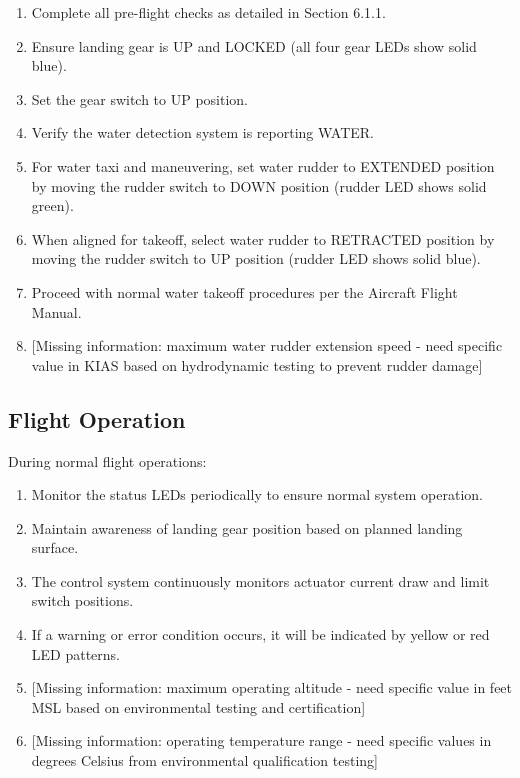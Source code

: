 \documentclass[12pt,a4paper,twoside,openright]{book}
\begin{document}
\begin{enumerate}
    \item Complete all pre-flight checks as detailed in Section 6.1.1.
    \item Ensure landing gear is UP and LOCKED (all four gear LEDs show solid blue).
    \item Set the gear switch to UP position.
    \item Verify the water detection system is reporting WATER.
    \item For water taxi and maneuvering, set water rudder to EXTENDED position by moving the rudder switch to DOWN position (rudder LED shows solid green).
    \item When aligned for takeoff, select water rudder to RETRACTED position by moving the rudder switch to UP position (rudder LED shows solid blue).
    \item Proceed with normal water takeoff procedures per the Aircraft Flight Manual.
    \item {\color{red}[Missing information: maximum water rudder extension speed - need specific value in KIAS based on hydrodynamic testing to prevent rudder damage]}
\end{enumerate}

\subsection{Flight Operation}

During normal flight operations:

\begin{enumerate}
    \item Monitor the status LEDs periodically to ensure normal system operation.
    \item Maintain awareness of landing gear position based on planned landing surface.
    \item The control system continuously monitors actuator current draw and limit switch positions.
    \item If a warning or error condition occurs, it will be indicated by yellow or red LED patterns.
    \item {\color{red}[Missing information: maximum operating altitude - need specific value in feet MSL based on environmental testing and certification]}
    \item {\color{red}[Missing information: operating temperature range - need specific values in degrees Celsius from environmental qualification testing]}
\end{enumerate}
\end{document}
